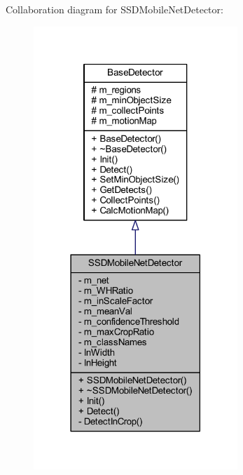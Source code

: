 Collaboration diagram for S\+S\+D\+Mobile\+Net\+Detector\+:\nopagebreak
\begin{figure}[H]
\begin{center}
\leavevmode
\includegraphics[width=218pt]{class_s_s_d_mobile_net_detector__coll__graph}
\end{center}
\end{figure}

